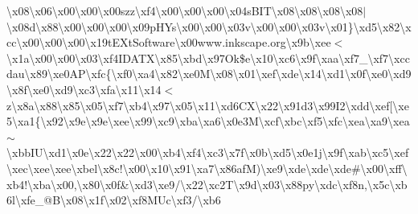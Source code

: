 \textbackslash{}x08\textbackslash{}x06\textbackslash{}x00\textbackslash{}x00\textbackslash{}x00szz\textbackslash{}xf4\textbackslash{}x00\textbackslash{}x00\textbackslash{}x00\textbackslash{}x04s\+B\+I\+T\textbackslash{}x08\textbackslash{}x08\textbackslash{}x08\textbackslash{}x08$\vert$\textbackslash{}x08d\textbackslash{}x88\textbackslash{}x00\textbackslash{}x00\textbackslash{}x00\textbackslash{}x09p\+H\+Ys\textbackslash{}x00\textbackslash{}x00\textbackslash{}x03v\textbackslash{}x00\textbackslash{}x00\textbackslash{}x03v\textbackslash{}x01\}\textbackslash{}xd5\textbackslash{}x82\textbackslash{}xcc\textbackslash{}x00\textbackslash{}x00\textbackslash{}x00\textbackslash{}x19t\+E\+Xt\+Software\textbackslash{}x00www.\+inkscape.\+org\textbackslash{}x9b\textbackslash{}xee$<$\textbackslash{}x1a\textbackslash{}x00\textbackslash{}x00\textbackslash{}x03\textbackslash{}xf4\+I\+D\+A\+T\+X\textbackslash{}x85\textbackslash{}xbd\textbackslash{}x97\+Ok\$e\textbackslash{}x10\textbackslash{}xc6\textbackslash{}x9f\textbackslash{}xaa\textbackslash{}xf7\+\_\+\textbackslash{}xf7\textbackslash{}xccdau\textbackslash{}x89\textbackslash{}xe0\+A\+P\textbackslash{}xfc\{\textbackslash{}xf0\textbackslash{}xa4\textbackslash{}x82\textbackslash{}xe0\+M\textbackslash{}x08\textbackslash{}x01\textbackslash{}xef\textbackslash{}xde\textbackslash{}x14\textbackslash{}xd1\textbackslash{}x0f\textbackslash{}xe0\textbackslash{}xd9\textbackslash{}x8f\textbackslash{}xe0\textbackslash{}xd9\textbackslash{}xc3\textbackslash{}xfa\textbackslash{}x11\textbackslash{}x14$<$z\textbackslash{}x8a\textbackslash{}x88\textquotesingle{}\textbackslash{}x85\textbackslash{}x05\textbackslash{}xf7\textbackslash{}xb4\textbackslash{}x97\textbackslash{}x05\textbackslash{}x11\textbackslash{}xd6\+C\+X\textbackslash{}x22\textbackslash{}x91d3\textbackslash{}x99\+I2\textbackslash{}xdd\textbackslash{}xef\mbox{[}\textbackslash{}xe5\textbackslash{}xa1\{\textbackslash{}x92\textbackslash{}x9e\textbackslash{}x9e\textbackslash{}xee\textbackslash{}x99\textbackslash{}xc9\textbackslash{}xba\textbackslash{}xa6\textbackslash{}x0e3\+M\textbackslash{}xcf\textbackslash{}xbc\textbackslash{}xf5\textbackslash{}xfc\textbackslash{}xea\textbackslash{}xa9\textbackslash{}xea$\sim$\textbackslash{}xbb\+I\+U\textbackslash{}xd1\textbackslash{}x0e\textbackslash{}x22\textbackslash{}x22\textbackslash{}x00\textbackslash{}xb4\textbackslash{}xf4\textbackslash{}xc3\textbackslash{}x7f\textbackslash{}x0b\textbackslash{}xd5\textbackslash{}x0e1j\textbackslash{}x9f\textbackslash{}xab\textbackslash{}xc5\textbackslash{}xef\textbackslash{}xec\textbackslash{}xee\textbackslash{}xee\textbackslash{}xbel\textbackslash{}x8c!\textbackslash{}x00\textbackslash{}x10\textbackslash{}x91\textbackslash{}xa7\textbackslash{}x86af\+M)\textbackslash{}xe9\textbackslash{}xde\textbackslash{}xde\textbackslash{}xde\#\textbackslash{}x00\textbackslash{}xff\textbackslash{}xb4!\textbackslash{}xba\textbackslash{}x00,\textbackslash{}x80\textbackslash{}x0f\&\textbackslash{}xd3\textbackslash{}xe9/\textbackslash{}x22\textbackslash{}xc2\+T\textbackslash{}x9d\textbackslash{}x03\textbackslash{}x88py\textbackslash{}xdc\textbackslash{}xf8n,\textbackslash{}x5c\textbackslash{}xb6l\textbackslash{}xfe\+\_\+@\+B\textbackslash{}x08\textbackslash{}x1f\textbackslash{}x02\textbackslash{}xf8\+M\+Uc\textbackslash{}xf3/\textbackslash{}xb6\